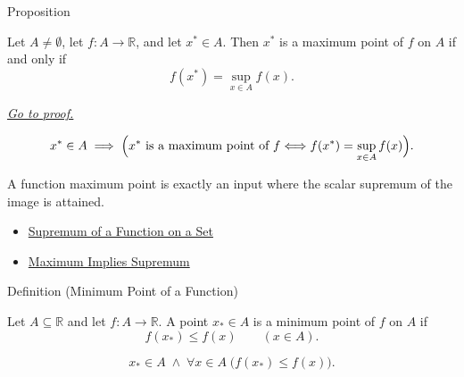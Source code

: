 \begin{propositionbox}{Proposition}
\begin{proposition}
\label{prop:maximum-point-characterized-by-supremum}
Let \(A\neq\emptyset\), let \(f:A\to\mathbb{R}\), and let \(x^*\in A\).
Then \(x^*\) is a maximum point of \(f\) on \(A\) if and only if
\[
  f(x^*)=\sup_{x\in A} f(x).
\]

\smallskip\noindent
\hyperref[prf:maximum-point-characterized-by-supremum]{\textit{Go to proof.}}
\end{proposition}
\end{propositionbox}

\begin{remark*}
\[
  x^*\in A
  \;\Longrightarrow\;
  \Bigl(x^*\text{ is a maximum point of }f
  \Longleftrightarrow f(x^*)=\sup_{x\in A}f(x)\Bigr).
\]
\end{remark*}

\begin{remark*}[Interpretation]
A function maximum point is exactly an input where the scalar supremum of the
image is attained.
\end{remark*}

\begin{dependencies}
\begin{itemize}
  \item \hyperref[def:function-supremum-on-set]{Supremum of a Function on a Set}
  \item \hyperref[prop:maximum-implies-supremum]{Maximum Implies Supremum}
\end{itemize}
\end{dependencies}

\begin{definitionbox}{Definition (Minimum Point of a Function)}
\begin{definition}
\label{def:function-minimum-point}
Let $A\subseteq\mathbb{R}$ and let $f:A\to\mathbb{R}$.  A point
$x_*\in A$ is a minimum point of $f$ on $A$ if
\[
  f(x_*)\leq f(x)
  \qquad (x\in A).
\]
\end{definition}
\end{definitionbox}

\begin{remark*}
\[
  x_*\in A\;\wedge\;\forall x\in A\;\bigl(f(x_*)\leq f(x)\bigr).
\]
\end{remark*}

